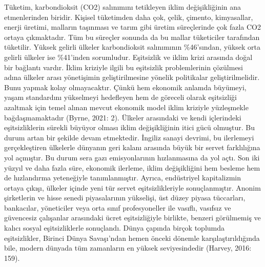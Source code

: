 \documentclass[
]{book}
\begin{document}
Tüketim, karbondioksit (CO2) salınımını tetikleyen iklim değişikliğinin ana etmenlerinden biridir. Kişisel tüketimden daha çok, çelik, çimento, kimyasallar, enerji üretimi, malların taşınması ve tarım gibi üretim süreçlerinde çok fazla CO2 ortaya çıkmaktadır. Tüm bu süreçler sonunda da bu mallar tüketiciler tarafından tüketilir. Yüksek gelirli ülkeler karbondioksit salınımının \%46'sından, yüksek orta gelirli ülkeler ise \%41'inden sorumludur. Eşitsizlik ve iklim krizi arasında doğal bir bağlantı vardır. İklim kriziyle ilgili bu eşitsizlik problemlerinin çözülmesi adına ülkeler arası yönetişimin geliştirilmesine yönelik politikalar geliştirilmelidir. Bunu yapmak kolay olmayacaktır. Çünkü hem ekonomik anlamda büyümeyi, yaşam standardını yükselmeyi hedefleyen hem de göreceli olarak eşitsizliği azaltmak için temel alınan mevcut ekonomik model iklim kriziyle yüzleşmekle bağdaşmamaktadır (Byrne, 2021: 2).
Ülkeler arasındaki ve kendi içlerindeki eşitsizliklerin sürekli büyüyor olması iklim değişikliğinin itici gücü olmuştur. Bu durum artan bir şekilde devam etmektedir. İngiliz sanayi devrimi, bu ilerlemeyi gerçekleştiren ülkelerle dünyanın geri kalanı arasında büyük bir servet farklılığına yol açmıştır. Bu durum sera gazı emisyonlarının hızlanmasına da yol açtı. Son iki yüzyıl ve daha fazla süre, ekonomik ilerleme, iklim değişikliğini hem besleme hem de hızlandırma yeteneğiyle tanımlanmıştır. Ayrıca, endüstriyel kapitalizmin ortaya çıkışı, ülkeler içinde yeni tür servet eşitsizlikleriyle sonuçlanmıştır. Anonim şirketlerin ve hisse senedi piyasalarının yükselişi, üst düzey piyasa tüccarları, bankacılar, yöneticiler veya orta sınıf profesyoneller ile vasıflı, vasıfsız ve güvencesiz çalışanlar arasındaki ücret eşitsizliğiyle birlikte, benzeri görülmemiş ve kalıcı sosyal eşitsizliklerle sonuçlandı. Dünya çapında birçok toplumda eşitsizlikler, Birinci Dünya Savaşı'ndan hemen önceki dönemle karşılaştırıldığında bile, modern dünyada tüm zamanların en yüksek seviyesindedir (Harvey, 2016: 159).
\end{document}
